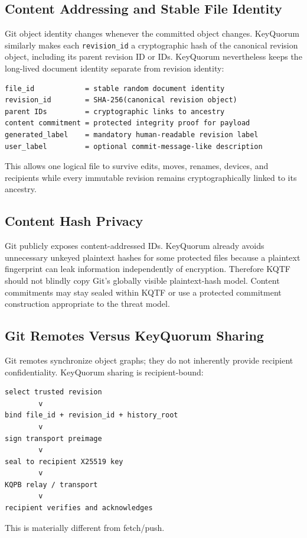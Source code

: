 \documentclass[11pt]{article}
\begin{document}
\subsection{Content Addressing and Stable File Identity}
Git object identity changes whenever the committed object changes. KeyQuorum similarly makes each \texttt{revision\_id} a cryptographic hash of the canonical revision object, including its parent revision ID or IDs. KeyQuorum nevertheless keeps the long-lived document identity separate from revision identity:

\begin{lstlisting}
file_id            = stable random document identity
revision_id        = SHA-256(canonical revision object)
parent IDs         = cryptographic links to ancestry
content commitment = protected integrity proof for payload
generated_label    = mandatory human-readable revision label
user_label         = optional commit-message-like description
\end{lstlisting}

This allows one logical file to survive edits, moves, renames, devices, and recipients while every immutable revision remains cryptographically linked to its ancestry.

\subsection{Content Hash Privacy}
Git publicly exposes content-addressed IDs. KeyQuorum already avoids unnecessary unkeyed plaintext hashes for some protected files because a plaintext fingerprint can leak information independently of encryption. Therefore KQTF should not blindly copy Git's globally visible plaintext-hash model. Content commitments may stay sealed within KQTF or use a protected commitment construction appropriate to the threat model.

\subsection{Git Remotes Versus KeyQuorum Sharing}
Git remotes synchronize object graphs; they do not inherently provide recipient confidentiality. KeyQuorum sharing is recipient-bound:
\begin{lstlisting}
select trusted revision
        v
bind file_id + revision_id + history_root
        v
sign transport preimage
        v
seal to recipient X25519 key
        v
KQPB relay / transport
        v
recipient verifies and acknowledges
\end{lstlisting}
This is materially different from fetch/push.
\end{document}
